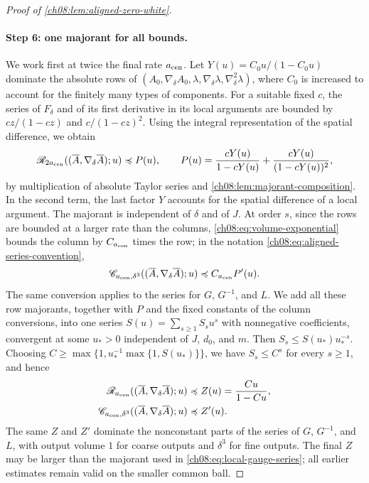 \begin{proof}[Proof of \cref{ch08:lem:aligned-zero-white}]
\paragraph{Step 6: one majorant for all bounds.}
We work first at twice the final rate $a_{\rm cen}$. Let $Y(u)=C_0u/(1-C_0u)$ dominate the absolute rows of $(A_0,\nabla_\delta A_0,\lambda,\nabla_\delta\lambda,\nabla_\delta^2\lambda)$, where $C_0$ is increased to account for the finitely many types of components. For a suitable fixed $c$, the series of $F_\delta$ and of its first derivative in its local arguments are bounded by $cz/(1-cz)$ and $c/(1-cz)^2$. Using the integral representation of the spatial difference, we obtain
\begin{equation}\label{ch08:eq:aligned-positive-composition}
 \mathscr R_{2a_{\rm cen}}
       ((\overline A,\nabla_\delta\overline A);u)
 \preccurlyeq
 P(u),\qquad P(u)=\frac{cY(u)}{1-cY(u)}
                 +\frac{cY(u)}{(1-cY(u))^2},
\end{equation}
by multiplication of absolute Taylor series and \cref{ch08:lem:majorant-composition}. In the second term, the last factor $Y$ accounts for the spatial difference of a local argument. The majorant is independent of $\delta$ and of $J$. At order $s$, since the rows are bounded at a larger rate than the columns, \eqref{ch08:eq:volume-exponential} bounds the column by $C_{a_{\rm cen}}$ times the row; in the notation \eqref{ch08:eq:aligned-series-convention},
\[
 \mathscr C_{a_{\rm cen},\delta^3}
       ((\overline A,\nabla_\delta\overline A);u)
       \preccurlyeq C_{a_{\rm cen}}P'(u).
\]
The same conversion applies to the series for $G$, $G^{-1}$, and $L$. We add all these row majorants, together with $P$ and the fixed constants of the column conversions, into one series $S(u)=\sum_{s\ge1}S_su^s$ with nonnegative coefficients, convergent at some $u_*>0$ independent of $J$, $d_0$, and $m$. Then $S_s\le S(u_*)u_*^{-s}$. Choosing $C\ge\max\{1,u_*^{-1}\max\{1,S(u_*)\}\}$, we have $S_s\le C^s$ for every $s\ge1$, and hence
\begin{equation}\label{ch08:eq:aligned-positive-majorant}
 \begin{aligned}
 \mathscr R_{a_{\rm cen}}
       ((\overline A,\nabla_\delta\overline A);u)
       &\preccurlyeq Z(u)=\frac{Cu}{1-Cu},\\
 \mathscr C_{a_{\rm cen},\delta^3}
       ((\overline A,\nabla_\delta\overline A);u)
       &\preccurlyeq Z'(u).
 \end{aligned}
\end{equation}
The same $Z$ and $Z'$ dominate the nonconstant parts of the series of $G$, $G^{-1}$, and $L$, with output volume $1$ for coarse outputs and $\delta^3$ for fine outputs. The final $Z$ may be larger than the majorant used in \eqref{ch08:eq:local-gauge-series}; all earlier estimates remain valid on the smaller common ball.


\end{proof}
